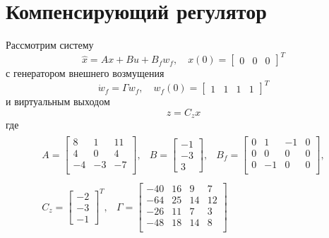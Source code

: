 \section{Компенсирующий регулятор}
Рассмотрим систему 
\begin{equation}
    \hat{x} = Ax + Bu + B_fw_f, \quad x(0) = \begin{bmatrix}0 & 0 & 0\end{bmatrix}^T
\end{equation}
с генератором внешнего возмущения 
\begin{equation}
    \dot{w}_f = \Gamma w_f, \quad w_f(0) = \begin{bmatrix}1 & 1 & 1 & 1\end{bmatrix}^T
\end{equation}
и виртуальным выходом
\begin{equation}
    z = C_z x 
\end{equation}
где 
\begin{equation}
    \begin{array}{cc}
        \begin{array}{ccc}
            A = \begin{bmatrix}
                8 & 1 & 11 \\ 
                4 & 0 & 4 \\ 
                -4 & -3 & -7 \\ 
            \end{bmatrix}, & 
            B = \begin{bmatrix} -1 \\ -3 \\ 3 \end{bmatrix}, &
            B_f = \begin{bmatrix}
                0 & 1 & -1 & 0 \\ 
                0 & 0 & 0 & 0 \\
                0 & -1 & 0 & 0 \\
            \end{bmatrix}, 
        \end{array} \\ 
        \begin{array}{cc}
        C_z = \begin{bmatrix} -2 \\ -3 \\ -1 \end{bmatrix}^T, & 
        \Gamma = \begin{bmatrix}
            -40 & 16 & 9 & 7 \\ 
            -64 & 25 & 14 & 12 \\
            -26 & 11 & 7 & 3 \\ 
            -48 & 18 & 14 & 8 \\ 
        \end{bmatrix}
        \end{array}
    \end{array}
\end{equation}

